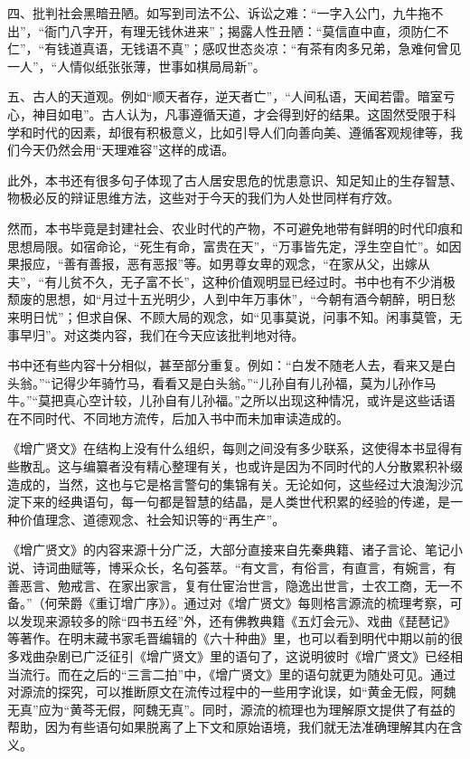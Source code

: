 \documentclass[12pt,UTF8]{ctexbook}
\begin{document}
四、批判社会黑暗丑陋。如写到司法不公、诉讼之难：“一字入公门，九牛拖不出”，“衙门八字开，有理无钱休进来”；揭露人性丑陋：“莫信直中直，须防仁不仁”，“有钱道真语，无钱语不真”；感叹世态炎凉：“有茶有肉多兄弟，急难何曾见一人”，“人情似纸张张薄，世事如棋局局新”。

五、古人的天道观。例如“顺天者存，逆天者亡”，“人间私语，天闻若雷。暗室亏心，神目如电”。古人认为，凡事遵循天道，才会得到好的结果。这固然受限于科学和时代的因素，却很有积极意义，比如引导人们向善向美、遵循客观规律等，我们今天仍然会用“天理难容”这样的成语。

此外，本书还有很多句子体现了古人居安思危的忧患意识、知足知止的生存智慧、物极必反的辩证思维方法，这些对于今天的我们为人处世同样有疗效。

然而，本书毕竟是封建社会、农业时代的产物，不可避免地带有鲜明的时代印痕和思想局限。如宿命论，“死生有命，富贵在天”，“万事皆先定，浮生空自忙”。如因果报应，“善有善报，恶有恶报”等。如男尊女卑的观念，“在家从父，出嫁从夫”，“有儿贫不久，无子富不长”，这种价值观明显已经过时。书中也有不少消极颓废的思想，如“月过十五光明少，人到中年万事休”，“今朝有酒今朝醉，明日愁来明日忧”；但求自保、不顾大局的观念，如“见事莫说，问事不知。闲事莫管，无事早归”。对这类内容，我们在今天应该批判地对待。

书中还有些内容十分相似，甚至部分重复。例如：“白发不随老人去，看来又是白头翁。”“记得少年骑竹马，看看又是白头翁。”“儿孙自有儿孙福，莫为儿孙作马牛。”“莫把真心空计较，儿孙自有儿孙福。”之所以出现这种情况，或许是这些话语在不同时代、不同地方流传，后加入书中而未加审读造成的。

《增广贤文》在结构上没有什么组织，每则之间没有多少联系，这使得本书显得有些散乱。这与编纂者没有精心整理有关，也或许是因为不同时代的人分散累积补缀造成的，当然，这也与它是格言警句的集锦有关。无论如何，这些经过大浪淘沙沉淀下来的经典语句，每一句都是智慧的结晶，是人类世代积累的经验的传递，是一种价值理念、道德观念、社会知识等的“再生产”。

《增广贤文》的内容来源十分广泛，大部分直接来自先秦典籍、诸子言论、笔记小说、诗词曲赋等，博采众长，名句荟萃。“有文言，有俗言，有直言，有婉言，有善恶言、勉戒言、在家出家言，复有仕宦治世言，隐逸出世言，士农工商，无一不备。”（何荣爵《重订增广序》）。通过对《增广贤文》每则格言源流的梳理考察，可以发现来源较多的除“四书五经”外，还有佛教典籍《五灯会元》、戏曲《琵琶记》等著作。在明末藏书家毛晋编辑的《六十种曲》里，也可以看到明代中期以前的很多戏曲杂剧已广泛征引《增广贤文》里的语句了，这说明彼时《增广贤文》已经相当流行。而在之后的“三言二拍”中，《增广贤文》里的语句就更为随处可见。通过对源流的探究，可以推断原文在流传过程中的一些用字讹误，如“黄金无假，阿魏无真”应为“黄芩无假，阿魏无真”。同时，源流的梳理也为理解原文提供了有益的帮助，因为有些语句如果脱离了上下文和原始语境，我们就无法准确理解其内在含义。
\end{document}
